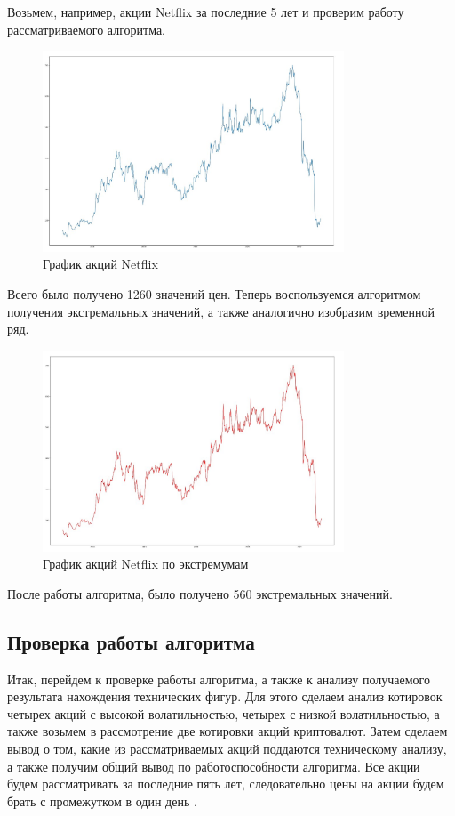 \documentclass[bachelor, och, coursework]{SCWorks}
\begin{document}
    Возьмем, например, акции Netflix за последние 5 лет и проверим работу
    рассматриваемого алгоритма.
    
    \begin{figure}[H]
        \centering
        \includegraphics[width=0.8\textwidth]{pic/NetflixInitial.jpg}
        \caption{График акций Netflix}
    \end{figure}

    Всего было получено 1260 значений цен. Теперь воспользуемся алгоритмом
    получения экстремальных значений, а также аналогично изобразим временной
    ряд.
    
    \begin{figure}[H]
        \centering
        \includegraphics[width=0.8\textwidth]{pic/NetflixExtrema.jpg}
        \caption{График акций Netflix по экстремумам}
    \end{figure}
    
    После работы алгоритма, было получено 560 экстремальных значений.


    \subsection{Проверка работы алгоритма}
    Итак, перейдем к проверке работы алгоритма, а также к анализу получаемого
    результата нахождения технических фигур. Для этого сделаем анализ котировок
    четырех акций с высокой волатильностью, четырех с низкой волатильностью, а
    также возьмем в рассмотрение две котировки акций криптовалют. Затем сделаем
    вывод о том, какие из рассматриваемых акций поддаются техническому анализу,
    а также получим общий вывод по работоспособности алгоритма. Все акции будем
    рассматривать за последние пять лет, следовательно цены на акции будем брать
    с промежутком в один день \cite{YF}.
    
\end{document}
